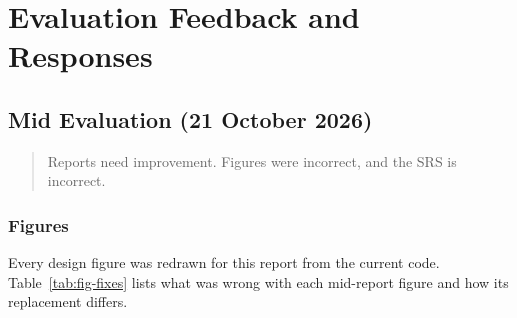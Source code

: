 \chapter{Evaluation Feedback and Responses}
\label{app:feedback}

\section{Mid Evaluation (21 October 2026)}
\begin{quote}
Reports need improvement. Figures were incorrect, and the SRS is incorrect.
\end{quote}

\subsection{Figures}
Every design figure was redrawn for this report from the current code. Table~\ref{tab:fig-fixes} lists what was wrong with each mid-report figure and how its replacement differs.

